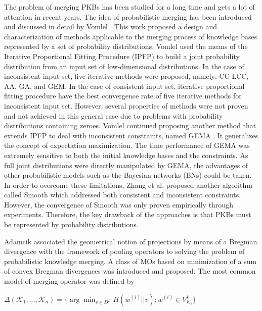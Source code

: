 \documentclass[]{iosart2c}
\begin{document}
  The problem of merging PKBs has been studied for a long time and gets a lot of attention in recent years. The idea of probabilistic merging has been introduced and discussed in detail by Vomlel \cite{18} . This work proposed a design and characterization of methods applicable to the merging process of knowledge bases represented by a set of probability distributions. Vomlel used the means of the Iterative Proportional Fitting Procedure (IPFP) to build a joint probability distribution from an input set of low-dimensional distributions. In the case of inconsistent input set, five iterative methods were proposed, namely: CC LCC, AA, GA, and GEM. In the case of consistent input set, iterative proportional fitting procedure have the best convergence rate of five iterative methods for inconsistent input set. However, several properties of methods were not proven and not achieved in this general case due to problems with probability distributions containing zeroes. Vomlel continued proposing another method that extends IPFP to deal with inconsistent constraints, named GEMA \cite{19}. It generalizes the concept of expectation maximization. The time performance of GEMA was extremely sensitive to both the initial knowledge bases and the constraints. As full joint distributions were directly manipulated by GEMA, the advantages of other probabilistic models such as the Bayesian networks (BNs) could be taken. In order to overcome these limitations, Zhang et al. \cite{20} proposed another algorithm called Smooth which addressed both consistent and inconsistent constraints. However, the convergence of Smooth was only proven empirically through experiments. Therefore, the key drawback of the approaches \citep{18} \citep{20} is that PKBs must be represented by probability distributions.

  Adamcik \cite{23} associated the geometrical notion of projections by means of a Bregman divergence with the framework of pooling operators to solving the problem of probabilistic knowledge merging. A class of MOs based on minimization of a sum of convex Bregman divergences was introduced and proposed. The most common model of merging operator was defined by

  $\Delta (\mathcal{K}_1, ... ,\mathcal{K}_n) = \{ \arg \min_{v \in D^L} H(w^{(i)}||v) : w^{(i)} \in V^L_{K_i}\}$
\end{document}
